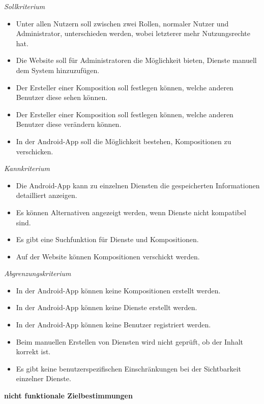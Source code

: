 \textit{Sollkriterium}

\begin{itemize}[leftmargin=4pc]
	\item Unter allen Nutzern soll zwischen zwei Rollen, normaler Nutzer und Administrator, unterschieden werden, wobei letzterer mehr Nutzungsrechte hat.
	\item Die Website soll für Administratoren die Möglichkeit bieten, Dienste manuell dem System hinzuzufügen.
	\item Der Ersteller einer Komposition soll festlegen können, welche anderen Benutzer diese sehen können.
	\item Der Ersteller einer Komposition soll festlegen können, welche anderen Benutzer diese verändern können.
	\item In der Android-App soll die Möglichkeit bestehen, Kompositionen zu verschicken.
\end{itemize}

\textit{Kannkriterium}

\begin{itemize}[leftmargin=4pc]
	\item Die Android-App kann zu einzelnen Diensten die gespeicherten Informationen detailliert anzeigen.
	\item Es können Alternativen angezeigt werden, wenn Dienste nicht kompatibel sind.
	\item Es gibt eine Suchfunktion für Dienste und Kompositionen.
	\item Auf der Website können Kompositionen verschickt werden.
\end{itemize}

\textit{Abgrenzungskriterium}

\begin{itemize}[leftmargin=4pc]
	\item In der Android-App können keine Kompositionen erstellt werden.
	\item In der Android-App können keine Dienste erstellt werden.
	\item In der Android-App können keine Benutzer registriert werden.
	\item Beim manuellen Erstellen von Diensten wird nicht geprüft, ob der Inhalt korrekt ist.
	\item Es gibt keine benutzerspezifischen Einschränkungen bei der Sichtbarkeit einzelner Dienste. \\
\end{itemize}


\textbf{nicht funktionale Zielbestimmungen}\newline


